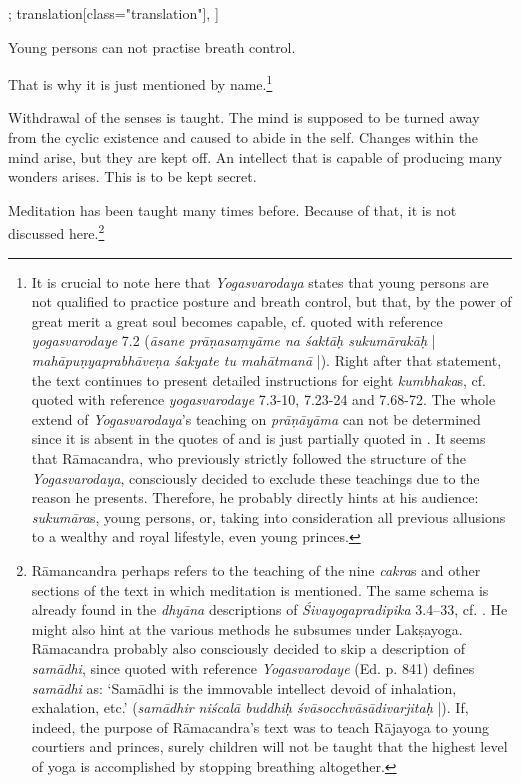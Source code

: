 \begin{alignment}[
  texts=edition[class="edition"];
  translation[class="translation"],
  ]
\begin{translation}
\begin{tlate}[p31_02]
Young persons can not practise breath control.

      That is why it is just mentioned by name.\footnote{It is crucial to note here that \textit{Yogasvarodaya} states that young persons are not qualified to practice posture and breath control, but that, by the power of great merit a great soul becomes capable, cf.  quoted with reference \textit{yogasvarodaye} 7.2 (\textit{āsane prāṇasaṃyāme na śaktāḥ sukumārakāḥ} | \textit{mahāpuṇyaprabhāveṇa śakyate tu mahātmanā} |). Right after that statement, the text continues to present detailed instructions for eight \textit{kumbhaka}s, cf.  quoted with reference \textit{yogasvarodaye} 7.3-10, 7.23-24 and 7.68-72. The whole extend of \textit{Yogasvarodaya}'s teaching on \textit{prāṇāyāma} can not be determined since it is absent in the quotes of  and is just partially quoted in . It seems that Rāmacandra, who previously strictly followed the structure of the \textit{Yogasvarodaya}, consciously decided to exclude these teachings due to the reason he presents. Therefore, he probably directly hints at his audience: \textit{sukumāra}s, young persons, or, taking into consideration all previous allusions to a wealthy and royal lifestyle, even young princes.}
      
      Withdrawal of the senses is taught. The mind is supposed to be turned away from the cyclic existence and caused to abide in the self. Changes within the mind arise, but they are kept off. An intellect that is capable of producing many wonders arises. This is to be kept secret.
      
      Meditation has been taught many times before. Because of that, it is not discussed here.\footnote{Rāmancandra perhaps refers to the teaching of the nine \textit{cakra}s and other sections of the text in which meditation is mentioned. The same schema is already found in the \textit{dhyāna} descriptions of \textit{Śivayogapradipika} 3.4–33, cf. \citeauthor[2023: pp. 165,212-215]{shivayogapradipika}. He might also hint at the various methods he subsumes under Lakṣayoga. Rāmacandra probably also consciously decided to skip a description of \textit{samādhi}, since  quoted with reference \textit{Yogasvarodaye} (Ed. p. 841) defines \textit{samādhi} as: `Samādhi is the immovable intellect devoid of inhalation, exhalation, etc.' (\textit{samādhir niścalā buddhiḥ śvāsocchvāsādivarjitaḥ} |). If, indeed, the purpose of Rāmacandra's text was to teach Rājayoga to young courtiers and princes, surely children will not be taught that the highest level of yoga is accomplished by stopping breathing altogether.}
      \flushpage
\end{tlate}
  \end{translation}
\end{alignment}
